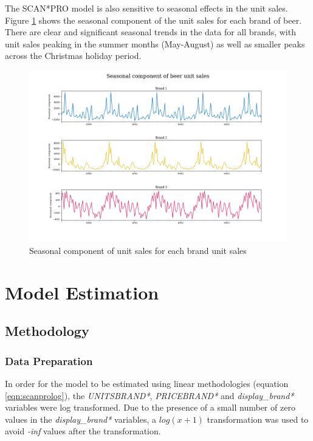 \documentclass[a4paper,11pt]{article}
\begin{document}
The SCAN*PRO model is also sensitive to seasonal effects in the unit sales. Figure \ref{fig:seasonal-plots} shows the seasonal component of the unit sales for each brand of beer. There are clear and significant seasonal trends in the data for all brands, with unit sales peaking in the summer months (May-August) as well as smaller peaks across the Christmas holiday period.


\begin{figure}
  \centering
  \includegraphics[scale=0.38]{seasonal_plots}
  \caption{Seasonal component of unit sales for each brand unit sales}\label{fig:seasonal-plots}
\end{figure}


\section{Model Estimation}
\subsection{Methodology}

\subsubsection{Data Preparation}
In order for the model to be estimated using linear methodologies (equation \ref{eqn:scanprolog}), the \textit{UNITSBRAND*}, \textit{PRICEBRAND*} and \textit{display\_brand*} variables were log transformed. Due to the presence of a small number of zero values in the \textit{display\_brand*} variables, a $log(x+1)$ transformation \citep{wooldridge_multiple_2016} was used to avoid \textit{-inf} values after the transformation.
\end{document}
